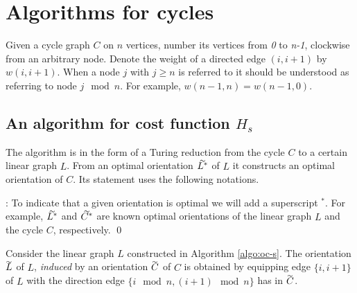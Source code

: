 \section{Algorithms for cycles}\label{s.c}
Given a cycle graph $C$ on $n$ vertices, number its vertices from \textit{0} to \textit{n-1}, 
clockwise from an arbitrary node. 
Denote the weight of a directed
edge $(i,i+1)$ by $w(i,i+1)$. When a node $j$ with $j\geq n$ is referred to it 
should be understood as referring to node $j \mod n$. 
For example, $w(n-1,n)=w(n-1,0)$.

\subsection{An algorithm for cost function $H_s$}


The algorithm is in the form of a Turing reduction from the cycle $C$ to a certain linear graph
$L$. From an optimal orientation $\tildeb{L^*}$ of $L$ it constructs an optimal orientation of $C$.
Its statement uses the following notations.

: To indicate that a given orientation is optimal 
we will add a superscript $^*$.
For example, $\tildeb{L^*}$ and $\tildeb{C^*}$ are known optimal orientations of 
the linear graph $L$ and the cycle $C$,
respectively.
\qed
\begin{definition}
	Consider the linear graph $L$ constructed in Algorithm \ref{algo:oc-s}. 
	The orientation $\tildeb{L}$ of $L$, \emph{induced} by an orientation $\tildeb{C}$ 
	of $C$ is obtained by equipping edge $\{i,i+1\}$ of $L$ with the direction edge
    $\{i \mod n, (i+1) \mod n\}$ has in $\tildeb{C}$.
\end{definition}

